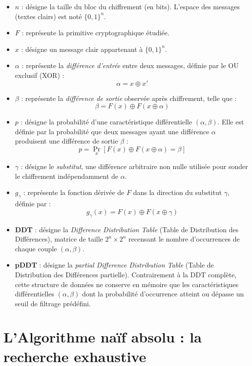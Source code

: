 \documentclass[a4paper,11pt]{article}
\begin{document}
\begin{itemize}
    \item \textbf{$n$} : désigne la taille du bloc du chiffrement (en bits). L'espace des messages (textes clairs) est noté $\{0, 1\}^n$.
    \item \textbf{$F$} : représente la primitive cryptographique étudiée.
    \item \textbf{$x$} : désigne un message clair appartenant à $\{0, 1\}^n$.
    \item \textbf{$\alpha$} : représente la \textit{différence d'entrée} entre deux messages, définie par le OU exclusif (XOR) :
    $$\alpha = x \oplus x'$$
    \item \textbf{$\beta$} : représente la \textit{différence de sortie} observée après chiffrement, telle que :
    $$\beta = F(x) \oplus F(x \oplus \alpha)$$
    \item \textbf{$p$} : désigne la probabilité d'une caractéristique différentielle $(\alpha, \beta)$. Elle est définie par la probabilité que deux messages ayant une différence $\alpha$ produisent une différence de sortie $\beta$ :
    $$p = \Pr_{x}[F(x) \oplus F(x \oplus \alpha) = \beta]$$
    \item \textbf{$\gamma$} : désigne le \textit{substitut}, une différence arbitraire non nulle utilisée pour sonder le chiffrement indépendamment de $\alpha$.
    \item \textbf{$g_{\gamma}$} : représente la fonction dérivée de $F$ dans la direction du substitut $\gamma$, définie par :
    $$g_{\gamma}(x) = F(x) \oplus F(x \oplus \gamma)$$
    \item \textbf{DDT} : désigne la \textit{Difference Distribution Table} (Table de Distribution des Différences), matrice de taille $2^n \times 2^n$ recensant le nombre d'occurrences de chaque couple $(\alpha, \beta)$.
    \item \textbf{pDDT} : désigne la \textit{partial Difference Distribution Table} (Table de Distribution des Différences partielle). Contrairement à la DDT complète, cette structure de données ne conserve en mémoire que les caractéristiques différentielles $(\alpha, \beta)$ dont la probabilité d'occurrence atteint ou dépasse un seuil de filtrage prédéfini.
\end{itemize}

\section{L'Algorithme naïf absolu : la recherche exhaustive}
\end{document}
